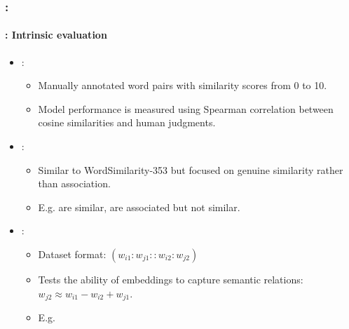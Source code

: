 \documentclass[xcolor=table]{beamer}
\begin{document}
\begin{frame}
	\frametitle{\insertshortsubtitle: \insertsection}
	\framesubtitle{\insertsubsection: Intrinsic evaluation}
	
	\begin{itemize}
		\item {} \cite{2002-finkelstein-al}:
		\begin{itemize}
			\item Manually annotated word pairs with similarity scores from 0 to 10.
			\item Model performance is measured using Spearman correlation between cosine similarities and human judgments.
		\end{itemize}
		
		\item {} \cite{2015-hill-al}:
		\begin{itemize}
			\item Similar to WordSimilarity-353 but focused on genuine similarity rather than association.
			\item E.g.  are similar,  are associated but not similar.
		\end{itemize}
		
		\item {} \cite{2013-mikolov-al2}:
		\begin{itemize}
			\item Dataset format: $(w_{i1}:w_{j1} :: w_{i2}:w_{j2})$
			\item Tests the ability of embeddings to capture semantic relations: $w_{j2} \approx w_{i1} - w_{i2} + w_{j1}$.
			\item E.g. 
		\end{itemize}
		
	\end{itemize}
	
\end{frame}
\end{document}
